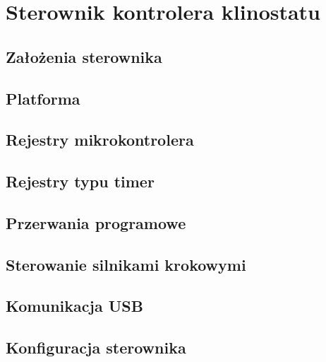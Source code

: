 \chapter{Sterownik kontrolera klinostatu}

\section{Założenia sterownika}

\section{Platforma}

\section{Rejestry mikrokontrolera}

\section{Rejestry typu timer}

\section{Przerwania programowe}

\section{Sterowanie silnikami krokowymi}

\section{Komunikacja USB}

\section{Konfiguracja sterownika}